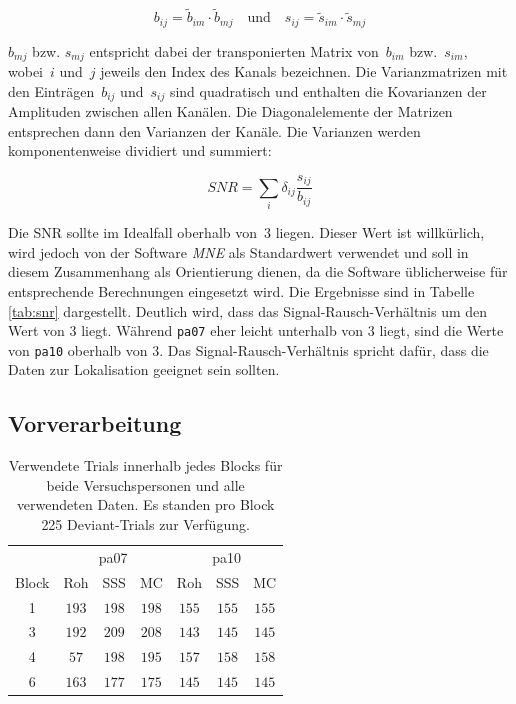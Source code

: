 \documentclass[doc,a4paper,12pt]{apa6}
\renewcommand{\arraystretch}{1.2}
\begin{document}
\begin{equation}
b_{ij} = \tilde{b}_{im} \cdot \tilde{b}_{mj} \quad \text{und} \quad s_{ij} = \tilde{s}_{im} \cdot \tilde{s}_{mj}
\end{equation}

$b_{mj}$ bzw. $s_{mj}$ entspricht dabei der transponierten Matrix von~$b_{im}$ bzw.~$s_{im}$, wobei~$i$ und~$j$ jeweils den Index des Kanals bezeichnen. Die Varianzmatrizen mit den Einträgen~$b_{ij}$ und~$s_{ij}$ sind quadratisch und enthalten die Kovarianzen der Amplituden zwischen allen Kanälen. Die Diagonalelemente der Matrizen entsprechen dann den Varianzen der Kanäle. Die Varianzen werden komponentenweise dividiert und summiert:

\begin{equation}
SNR = \sum_i \delta_{ij} \frac{s_{ij}}{b_{ij}}
\end{equation}

Die SNR sollte im Idealfall oberhalb von~$3$ liegen. Dieser Wert ist willkürlich, wird jedoch von der Software \emph{MNE} als Standardwert verwendet und soll in diesem Zusammenhang als Orientierung dienen, da die Software üblicherweise für entsprechende Berechnungen eingesetzt wird. Die Ergebnisse sind in Tabelle \ref{tab:snr} dargestellt. Deutlich wird, dass das Signal-Rausch-Verhältnis um den Wert von $3$ liegt. Während \texttt{pa07} eher leicht unterhalb von $3$ liegt, sind die Werte von \texttt{pa10} oberhalb von $3$. Das Signal-Rausch-Verhältnis spricht dafür, dass die Daten zur Lokalisation geeignet sein sollten.

\subsection{Vorverarbeitung}
\label{sec:ergebnis-vorverarbeitung}

\begin{table}
  \caption{}
  \label{tab:rejecting}
  \vspace*{3mm}
  \centering
  \setlength{\tabcolsep}{7mm}
  \renewcommand{\arraystretch}{1.5}
  \begin{tabular}{ccccccc}
  \hline
  & \multicolumn{3}{c}{pa07} & \multicolumn{3}{c}{pa10}\\
  Block & Roh & SSS & MC & Roh & SSS & MC \\
  \hline
  1 & $193$ & $198$ & $198$ & $155$ & $155$ & $155$\\
  3 & $192$ & $209$ & $208$ & $143$ & $145$ & $145$\\
  4 & $57$ & $198$ & $195$ & $157$ & $158$ & $158$\\
  6 & $163$ & $177$ & $175$ & $145$ & $145$ & $145$\\
  \hline
  \end{tabular}
  \vspace*{3mm}
  \caption*{Verwendete Trials innerhalb jedes Blocks für beide Versuchspersonen und alle verwendeten Daten. Es standen pro Block 225 Deviant-Trials zur Verfügung.}
\end{table}
\end{document}

